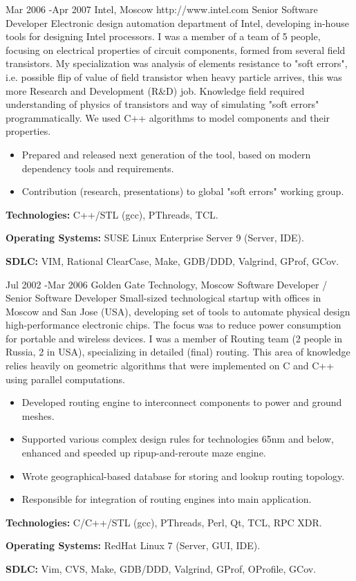 \documentclass[10pt]{article} %
\begin{document}
\job
{Mar 2006 -}{Apr 2007}
{Intel, Moscow}
{http://www.intel.com}
{Senior Software Developer}
{Electronic design automation department of Intel, developing in-house tools for designing Intel processors.
I was a member of a team of 5 people, focusing on electrical properties of circuit components, formed from several 
field transistors. My specialization was analysis of elements resistance to "soft errors", i.e. possible
flip of value of field transistor when heavy particle arrives, this was more Research and Development (R\&D) job.
Knowledge field required understanding of physics of transistors and way of simulating "soft errors" programmatically.
We used C++ algorithms to model components and their properties.}
{\begin{itemize}
\item{Prepared and released next generation of the tool, based on modern dependency tools and requirements.}
\item{Contribution (research, presentations) to global "soft errors" working group.}
\end{itemize}}
{\rule{0mm}{5mm}\textbf{Technologies:} C++/STL (gcc), PThreads, TCL.\\
\rule{0mm}{5mm}\textbf{Operating Systems:} SUSE Linux Enterprise Server 9 (Server, IDE).\\
\rule{0mm}{5mm}\textbf{SDLC:} VIM, Rational ClearCase, Make, GDB/DDD, Valgrind, GProf, GCov.
}


\job
{Jul 2002 -}{Mar 2006}
{Golden Gate Technology, Moscow}
{}
{Software Developer / Senior Software Developer}
{Small-sized technological startup with offices in Moscow and San Jose (USA), developing set of tools
to automate physical design high-performance electronic chips. The focus was to reduce power consumption
for portable and wireless devices. I was a member of Routing team (2 people in Russia, 2 in USA),
specializing in detailed (final) routing. This area of knowledge relies heavily on geometric algorithms
that were implemented on C and C++ using parallel computations.}
{\begin{itemize}
\item{Developed routing engine to interconnect components to power and ground meshes.}
\item{Supported various complex design rules for technologies 65nm and below, enhanced and speeded up ripup-and-reroute maze engine.}
\item{Wrote geographical-based database for storing and lookup routing topology.}
\item{Responsible for integration of routing engines into main application.}
\end{itemize}}
{\rule{0mm}{5mm}\textbf{Technologies:} C/C++/STL (gcc), PThreads, Perl, Qt, TCL, RPC XDR.\\
\rule{0mm}{5mm}\textbf{Operating Systems:} RedHat Linux 7 (Server, GUI, IDE).\\
\rule{0mm}{5mm}\textbf{SDLC:} Vim, CVS, Make, GDB/DDD, Valgrind, GProf, OProfile, GCov.
}
\end{document}
